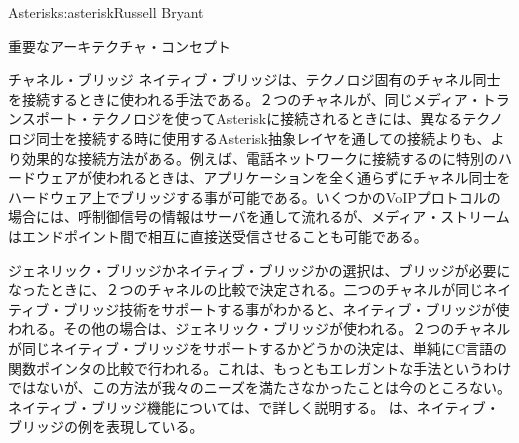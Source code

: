 \begin{aosachapter}{Asterisk}{s:asterisk}{Russell Bryant}
\begin{aosasect1}{重要なアーキテクチャ・コンセプト}
\begin{aosasect2}{チャネル・ブリッジ}
ネイティブ・ブリッジは、テクノロジ固有のチャネル同士を接続するときに使われる手法である。２つのチャネルが、同じメディア・トランスポート・テクノロジを使ってAsteriskに接続されるときには、異なるテクノロジ同士を接続する時に使用するAsterisk抽象レイヤを通しての接続よりも、より効果的な接続方法がある。例えば、電話ネットワークに接続するのに特別のハードウェアが使われるときは、アプリケーションを全く通らずにチャネル同士をハードウェア上でブリッジする事が可能である。いくつかのVoIPプロトコルの場合には、呼制御信号の情報はサーバを通して流れるが、メディア・ストリームはエンドポイント間で相互に直接送受信させることも可能である。

ジェネリック・ブリッジかネイティブ・ブリッジかの選択は、ブリッジが必要になったときに、２つのチャネルの比較で決定される。二つのチャネルが同じネイティブ・ブリッジ技術をサポートする事がわかると、ネイティブ・ブリッジが使われる。その他の場合は、ジェネリック・ブリッジが使われる。２つのチャネルが同じネイティブ・ブリッジをサポートするかどうかの決定は、単純にC言語の関数ポインタの比較で行われる。これは、もっともエレガントな手法というわけではないが、この方法が我々のニーズを満たさなかったことは今のところない。ネイティブ・ブリッジ機能については、で詳しく説明する。
は、ネイティブ・ブリッジの例を表現している。


\end{aosasect2}
\end{aosasect1}
\end{aosachapter}
